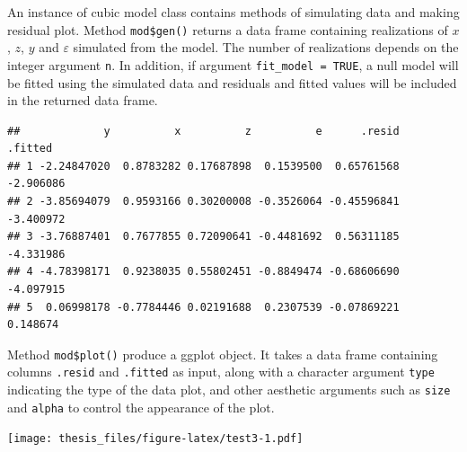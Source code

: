 \documentclass{monashthesis}
\begin{document}
An instance of cubic model class contains methods of simulating data and making residual plot. Method \texttt{mod\$gen()} returns a data frame containing realizations of \(x\), \(z\), \(y\) and \(\varepsilon\) simulated from the model. The number of realizations depends on the integer argument \texttt{n}. In addition, if argument \texttt{fit\_model\ =\ TRUE}, a null model will be fitted using the simulated data and residuals and fitted values will be included in the returned data frame.

\begin{Shaded}
\begin{Highlighting}[]
\SpecialCharTok{$}\NormalTok{(} \NormalTok{, } \NormalTok{)}
\end{Highlighting}
\end{Shaded}

\begin{verbatim}
##             y          x          z          e      .resid   .fitted
## 1 -2.24847020  0.8783282 0.17687898  0.1539500  0.65761568 -2.906086
## 2 -3.85694079  0.9593166 0.30200008 -0.3526064 -0.45596841 -3.400972
## 3 -3.76887401  0.7677855 0.72090641 -0.4481692  0.56311185 -4.331986
## 4 -4.78398171  0.9238035 0.55802451 -0.8849474 -0.68606690 -4.097915
## 5  0.06998178 -0.7784446 0.02191688  0.2307539 -0.07869221  0.148674
\end{verbatim}

Method \texttt{mod\$plot()} produce a ggplot \autocite{wickham_ggplot2_2011} object. It takes a data frame containing columns \texttt{.resid} and \texttt{.fitted} as input, along with a character argument \texttt{type} indicating the type of the data plot, and other aesthetic arguments such as \texttt{size} and \texttt{alpha} to control the appearance of the plot.

\begin{Shaded}
\begin{Highlighting}[]
\SpecialCharTok{$}\SpecialCharTok{$}\NormalTok{(} \NormalTok{, } \NormalTok{), } \NormalTok{, } \NormalTok{)}
\end{Highlighting}
\end{Shaded}

\texttt{[image: thesis\_files/figure-latex/test3-1.pdf]}
\end{document}

